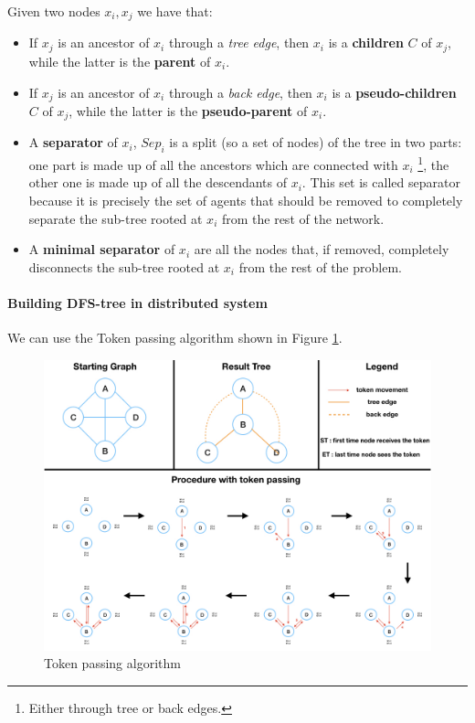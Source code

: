 \documentclass[10pt,a4paper]{article}
\begin{document}
Given two nodes $x_i,x_j$ we have that:
\begin{itemize}
\item If $x_j$ is an ancestor of $x_i$ through a \textit{tree edge}, then $x_i$ is a \textbf{children} $C$ of $x_j$, while the latter is the \textbf{parent} of $x_i$.
\item If $x_j$ is an ancestor of $x_i$ through a \textit{back edge}, then $x_i$ is a \textbf{pseudo-children} $C$ of $x_j$, while the latter is the \textbf{pseudo-parent} of $x_i$.
\item A \textbf{separator} of $x_i$, $Sep_i$ is a split (so a set of nodes) of the tree in two parts: one part is made up of all the ancestors which are connected with $x_i$ \footnote{Either through tree or back edges.}, the other one is made up of all the descendants of $x_i$. This set is called separator because it is precisely the set of agents that should be removed to completely separate the sub-tree rooted at $x_i$ from the rest of the network.
\item A \textbf{minimal separator} of $x_i$ are all the nodes that, if removed, completely disconnects the sub-tree rooted at $x_i$ from the rest of the problem.
\end{itemize}

\paragraph{Building DFS-tree in distributed system}
We can use the Token passing algorithm shown in Figure \ref{fig:token_pass}.

\begin{figure}[H]
\centering
\includegraphics[scale=0.4]{images/token_passing.jpeg}
\caption{Token passing algorithm}
\label{fig:token_pass}
\end{figure}
\end{document}
